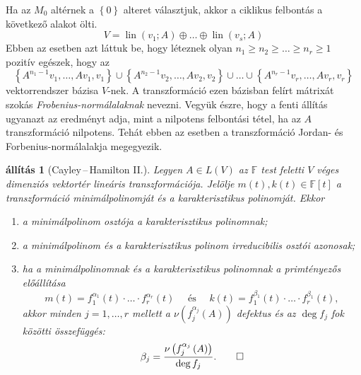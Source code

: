 \documentclass[a4paper, showtrims]{memoir}
\theoremstyle{plain}
\newtheorem{proposition}{állítás}[chapter]
\theoremstyle{remark}
\theoremstyle{definition}
\DeclareMathOperator{\lin}{lin}
\begin{document}
Ha az $M_0$ altérnek a $\left\{ 0 \right\}$ alteret választjuk, akkor a ciklikus felbontás a következő alakot ölti.	
\[
V=
        \lin\left( v_1;A \right)
        \oplus\ldots\oplus
        \lin\left( v_s;A \right)
\]
Ebben az esetben azt láttuk be, hogy léteznek olyan $n_1\geq n_2\geq \dots\geq n_r\geq 1$ pozitív egészek, hogy az
\[
		\left\{ A^{n_1-1}v_1,\ldots,Av_1,v_1 \right\}
		\cup
		\left\{ A^{n_2-1}v_2,\ldots,Av_2,v_2 \right\}
		\cup
		\ldots
		\cup
		\left\{ A^{n_r-1}v_r,\ldots,Av_r,v_r \right\}
		\tag{\dag}
\]
vektorrendszer bázisa $V$-nek. A transzformáció ezen bázisban felírt mátrixát szokás \textit{Frobenius-normálalaknak} nevezni. Vegyük észre, hogy a fenti állítás ugyanazt az eredményt adja, mint a nilpotens felbontási tétel, ha az $A$ transzformáció nilpotens. Tehát ebben az esetben a transzformáció Jordan- és Forbenius-normálalakja megegyezik.
\begin{proposition}[Cayley\,--\,Hamilton II.]
    Legyen $A\in L\left( V \right)$ az $\mathbb{F}$ test feletti $V$ véges dimenziós vektortér
    lineáris transzformációja.
    Jelölje $m\left( t \right), k\left( t \right)\in\mathbb{F}\left[ t \right]$
    a transzformáció minimálpolinomját és a karakterisztikus polinomját.
    Ekkor
    \begin{enumerate}
        \item a minimálpolinom osztója a karakterisztikus polinomnak;
        \item a minimálpolinom és a karakterisztikus polinom irreducibilis osztói azonosak;
        \item ha a minimálpolinomnak és a karakterisztikus polinomnak a primtényezős előállítása
            \[
                m\left( t \right)
                =
                f_1^{\alpha_1}\left( t \right)
                \cdot\ldots\cdot
                f_r^{\alpha_r}\left( t \right)
                \quad\text{ és }\quad
                k\left( t \right)
                =
                f_1^{\beta_1}\left( t \right)
                \cdot\ldots\cdot
                f_r^{\beta_1}\left( t \right),
            \]
            akkor minden $j=1,\ldots,r$ mellett a $\nu\left( f_j^{\alpha_j} \left( A \right)\right)$ defektus
            és az $\deg f_j$ fok közötti összefüggés:
            \[
                \beta_j
                =
                \frac{\nu\left( f_j^{\alpha_j}\left( A \right) \right)}{\deg f_j}.
                \qedhere
            \]
    \end{enumerate}
\end{proposition}
\end{document}
